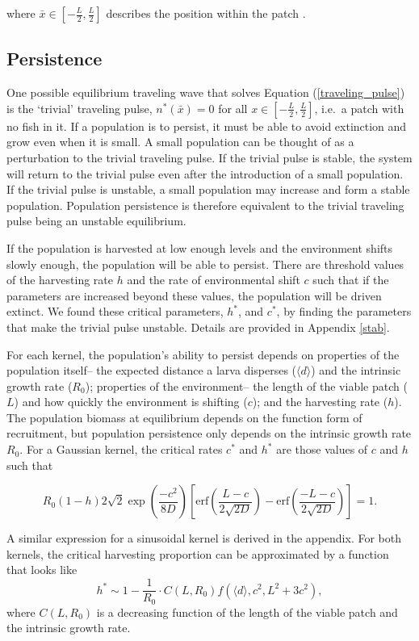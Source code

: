\documentclass[12pt,english]{article}
\begin{document}
\begin{spacing}{1.9}
\begin{flushleft}
\noindent where $\bar{x}\in\left[-\frac{L}{2}, \frac{L}{2}\right]$ describes the position within the patch \citep{ZhouKot2011}.

\subsection{Persistence }
One possible equilibrium traveling wave that solves Equation (\ref{traveling_pulse}) is the `trivial' traveling pulse, $n^*(\bar{x}) = 0$ for all $x \in \left[-\frac{L}
{2}, \frac{L}{2}\right]$, i.e.~a patch with no fish in it.  If a population is to persist, it must be able to avoid extinction and 
grow even when it is small.   A small population can be thought of as a perturbation to the trivial traveling pulse. If the trivial 
pulse is stable, the system will return to the trivial pulse even after the introduction 
of a small population. If the trivial pulse is unstable, a small population may increase and form a stable population.   Population persistence is therefore equivalent to the trivial traveling pulse being an unstable equilibrium.   

If the population is harvested at low enough levels and the environment shifts slowly enough, the population will be able to persist.  There are threshold values of the harvesting rate $h$ and the rate of environmental shift $c$ such that if the parameters are increased beyond these values, the population will be driven extinct.  We found these critical parameters, $h^*$, and  $c^*$, by finding the parameters that make the trivial pulse unstable.   Details are provided in Appendix \ref{stab}.
   

For each kernel, the population's ability to persist depends on properties of the population itself-- the expected distance a larva disperses ($\langle d \rangle$) and the intrinsic growth rate ($R_0$); properties of the environment-- the length of the viable patch ($L$) and how quickly the environment is shifting ($c$); and the harvesting rate ($h
$).  The population biomass at equilibrium depends on the function form of recruitment, but population persistence only depends on the intrinsic growth rate $R_0$.  For a Gaussian kernel, the critical rates $c^*$ and $h^*$ are those values of $c$ and $h$ such that 

\[R_0(1-h)2\sqrt{2}\exp\left(\frac{-c^2}{8D}\right)\left[\text{erf}\left(\frac{L-c}{2\sqrt{2D}}\right)-\text{erf}\left(\frac{-L-c}{2\sqrt{2D}}\right)\right]=1.\]

A similar expression for a sinusoidal kernel is derived in the appendix.  For both kernels, the critical harvesting proportion can be approximated by a function that looks like 
\begin{equation*}
h^*\sim1- \frac{1}{R_0}\cdot C(L,R_0)f(\langle d \rangle,c^2,L^2+3c^2),
\end{equation*}
where $C(L,R_0)$ is a decreasing function of the length of the viable patch and the intrinsic growth rate.
   


\end{flushleft}
\end{spacing}
\end{document}
